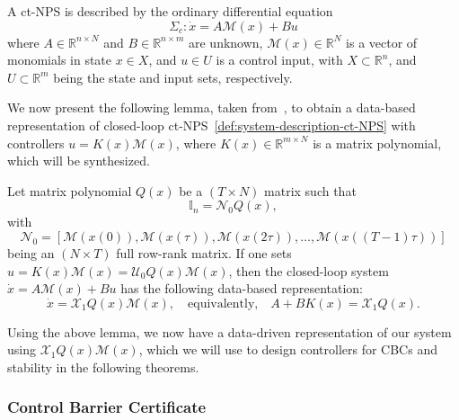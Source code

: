 \documentclass[sigconf]{acmart}
\begin{document}
\begin{definition}
\label{def:system-description-ct-NPS}
A ct-NPS is described by the ordinary differential equation
\begin{equation}
\label{eq:ct-NPS}
\Sigma_c: \dot{x} = A\mathcal{M}(x)+Bu
\end{equation}
where $A\in\mathbb{R}^{n\times N}$ and $B\in\mathbb{R}^{n\times m}$ are unknown, $\mathcal{M}(x)\in\mathbb{R}^N$ is a vector of monomials in state $x\in X$, and $u\in U$ is a control input, with $X\subset\mathbb{R}^n$, and $U\subset\mathbb{R}^m$ being the state and input sets, respectively.
\end{definition}

We now present the following lemma, taken from~\cite{nejati2022data}, to obtain a data-based representation of closed-loop ct-NPS~\eqref{def:system-description-ct-NPS} with controllers $u=K(x)\mathcal{M}(x)$, where $K(x)\in\mathbb{R}^{m\times N}$ is a matrix polynomial, which will be synthesized.

\begin{lemma}
\label{lem:Q-ctNPS}
Let matrix polynomial $Q(x)$ be a $(T\times N)$ matrix such that
\begin{equation}
\label{eq:Q-matrix-ctNPS}
\mathbb{I}_n = \mathcal{N}_{0}Q(x),
\end{equation}
with
\begin{equation}
\label{eq:data-N0T}
\mathcal{N}_{0} = [\mathcal{M}(x(0)), \mathcal{M}(x(\tau)), \mathcal{M}(x(2\tau)), \ldots, \mathcal{M}(x((T-1)\tau))]
\end{equation}being an $(N\times T)$ full row-rank matrix.
If one sets $u=K(x)\mathcal{M}(x) = \mathcal{U}_{0}Q(x)\mathcal{M}(x)$, then the closed-loop system $\dot{x}=A\mathcal{M}(x)+Bu$ has the following data-based representation:
\begin{equation}
\label{eq:A+BK=X1TQ-ctNPS}
\dot{x} = \mathcal{X}_{1}Q(x)\mathcal{M}(x),\quad\text{equivalently,}\quad A+BK(x) = \mathcal{X}_{1}Q(x).
\end{equation}
\end{lemma}

Using the above lemma, we now have a data-driven representation of our system using $\mathcal{X}_{1}Q(x)\mathcal{M}(x)$, which we will use to design controllers for CBCs and stability in the following theorems.

\subsubsection{Control Barrier Certificate}
\end{document}

